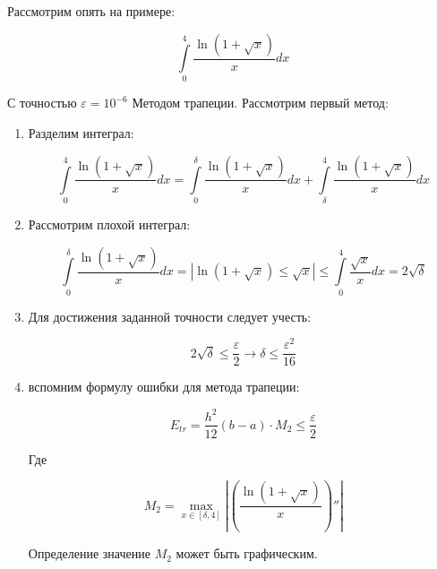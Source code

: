 \documentclass[10pt,a4paper]{article}
\begin{document}
	Рассмотрим опять на примере:
	
	\begin{equation}
		\int\limits_{0}^{4} \frac{\ln\left(1 + \sqrt{x}\right)}{x}dx
	\end{equation}
	
	С точностью $\varepsilon = 10^{-6}$ Методом трапеции. Рассмотрим первый 
	метод:
	
	\begin{enumerate}
		\item Разделим интеграл:
		
		\begin{equation}
			\int\limits_{0}^{4} \frac{\ln\left(1 + \sqrt{x}\right)}{x}dx = 
			\int\limits_{0}^{\delta} \frac{\ln\left(1 + \sqrt{x}\right)}{x}dx + 
			\int\limits_{\delta}^{4} \frac{\ln\left(1 + \sqrt{x}\right)}{x}dx
		\end{equation}
		
		\item Рассмотрим плохой интеграл:
		
		\begin{equation}
			\int\limits_{0}^{\delta} \frac{\ln\left(1 + \sqrt{x}\right)}{x}dx = 
			\left|\ln\left(1 + \sqrt{x}\right) \leqslant \sqrt{x}\right| 
			\leqslant 
			\int\limits_{0}^{4} \frac{\sqrt{x}}{x}dx = 2\sqrt{\delta}
		\end{equation}
		
		\item Для достижения заданной точности следует учесть:
		
		\begin{equation}
			2\sqrt{\delta} \leqslant \frac{\varepsilon}{2}\rightarrow \delta
			\leqslant\frac{\varepsilon^{2}}{16}
		\end{equation}
		
		\item вспомним формулу ошибки для метода трапеции:
		
		\begin{equation}
			E_{tr} = \frac{h^{2}}{12}\left(b - a\right)\cdot M_{2}\leqslant
			\frac{\varepsilon}{2}
		\end{equation}
		
		Где 
		
		\begin{equation}
			M_{2} = \max\limits_{x \in \left[\delta, 4\right]}\left|
			\left(\frac{\ln\left(1 + \sqrt{x}\right)}{x}\right)''\right| 
		\end{equation}
		
		Определение значение $M_{2}$ может быть графическим.
	\end{enumerate}
	
\end{document}
